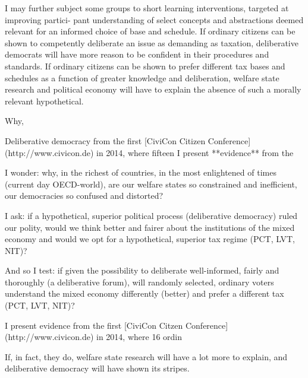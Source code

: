 I may further subject some groups to short learning interventions, targeted at improving partici- pant understanding of select concepts and abstractions deemed relevant for an informed choice of base and schedule.
If ordinary citizens can be shown to competently deliberate an issue as demanding as taxation, deliberative democrats will have more reason to be confident in their procedures and standards.
If ordinary citizens can be shown to prefer different tax bases and schedules as a function of greater knowledge and deliberation, welfare state research and political economy will have to explain the absence of such a morally relevant hypothetical.

Why,

Deliberative democracy from the first [CiviCon Citizen Conference](http://www.civicon.de) in 2014, where fifteen
I present **evidence** from the

I wonder:
why, in the richest of countries, in the most enlightened of times (current day OECD-world), are our welfare states so constrained and inefficient, our democracies so confused and distorted?

I ask:
if a hypothetical, superior political process (deliberative democracy) ruled our polity, would we think better and fairer about the institutions of the mixed economy and would we opt for a hypothetical, superior tax regime (PCT, LVT, NIT)?

And so I test:
if given the possibility to deliberate well-informed, fairly and thoroughly (a deliberative forum), will randomly selected, ordinary voters understand the mixed economy differently (better) and prefer a different tax (PCT, LVT, NIT)?

I present evidence from the first [CiviCon Citzen Conference](http://www.civicon.de) in 2014, where 16 ordin

If, in fact, they do, welfare state research will have a lot more to explain, and deliberative democracy will have shown its stripes.
